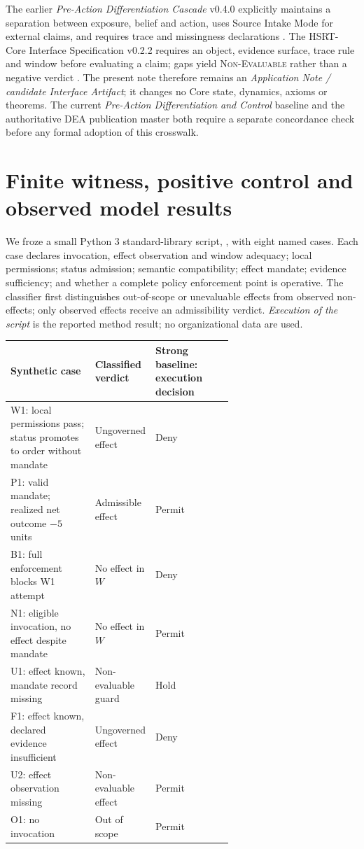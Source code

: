 \documentclass[11pt,a4paper]{article}
\newcommand{\NE}{\textsc{Non-Evaluable}}
\begin{document}
The earlier \emph{Pre-Action Differentiation Cascade} v0.4.0 explicitly maintains a separation between exposure, belief and action, uses Source Intake Mode for external claims, and requires trace and missingness declarations \cite{padc2026}. The HSRT-Core Interface Specification v0.2.2 requires an object, evidence surface, trace rule and window before evaluating a claim; gaps yield \NE{} rather than a negative verdict \cite{interface2026}. The present note therefore remains an \emph{Application Note / candidate Interface Artifact}; it changes no Core state, dynamics, axioms or theorems. The current \emph{Pre-Action Differentiation and Control} baseline and the authoritative DEA publication master both require a separate concordance check before any formal adoption of this crosswalk.

\section{Finite witness, positive control and observed model results}
We froze a small Python 3 standard-library script, , with eight named cases. Each case declares invocation, effect observation and window adequacy; local permissions; status admission; semantic compatibility; effect mandate; evidence sufficiency; and whether a complete policy enforcement point is operative. The classifier first distinguishes out-of-scope or unevaluable effects from observed non-effects; only observed effects receive an admissibility verdict. \emph{Execution of the script} is the reported method result; no organizational data are used.

\begin{center}
\small
\begin{tabularx}{\linewidth}{@{}P{0.38\linewidth}P{0.25\linewidth}Y@{}}
\toprule
\textbf{Synthetic case} & \textbf{Classified verdict} & \textbf{Strong baseline: execution decision}\\
\midrule
W1: local permissions pass; status promotes to order without mandate & Ungoverned effect & Deny\\
P1: valid mandate; realized net outcome $-5$ units & Admissible effect & Permit\\
B1: full enforcement blocks W1 attempt & No effect in $W$ & Deny\\
N1: eligible invocation, no effect despite mandate & No effect in $W$ & Permit\\
U1: effect known, mandate record missing & Non-evaluable guard & Hold\\
F1: effect known, declared evidence insufficient & Ungoverned effect & Deny\\
U2: effect observation missing & Non-evaluable effect & Permit\\
O1: no invocation & Out of scope & Permit\\
\bottomrule
\end{tabularx}
\end{center}
\end{document}
